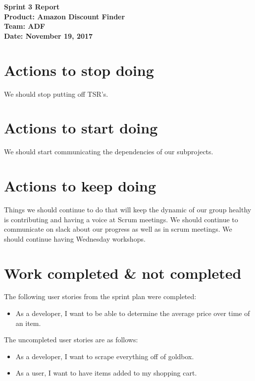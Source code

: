 \documentclass[11pt]{article}
\newcommand\tab[1][1cm]{\hspace*{#1}}
\begin{document}
	\Large{\textbf{Sprint 3 Report}}\\
	\Large{\textbf{Product: Amazon Discount Finder}}\\
	\Large{\textbf{Team: ADF}}\\
	\Large{\textbf{Date: November 19, 2017}}\\
	
	\vspace{-3mm}
	
	\section{Actions to stop doing}
		\vspace{-3mm}
		\tab \normalsize{We should stop putting off TSR's. }
		
	\section{Actions to start doing}
		\vspace{-3mm}
		\tab \normalsize{We should start communicating the dependencies of our subprojects. }
		
	\section{Actions to keep doing}
		\vspace{-3mm}
		\tab \normalsize{Things we should continue to do that will keep the dynamic of our group healthy is contributing and having a voice at Scrum meetings. We should continue to communicate on slack about our progress as well as in scrum meetings. We should continue having Wednesday workshops. }
		
	\section{Work completed \& not completed}
		\vspace{-3mm}
		\normalsize{The following user stories from the sprint plan were completed:}\\
		\vspace{-3mm}
		\begin{itemize}
			\item As a developer, I want to be able to determine the average price over time of an item.
		\end{itemize}
		\vspace{-3mm}
		\normalsize{The uncompleted user stories are as follows:}\\
		\vspace{-3mm}
		\begin{itemize}		
			\item As a developer, I want to scrape everything off of goldbox.
			\item As a user, I want to have items added to my shopping cart.
		\end{itemize}
		\vspace{-3mm}
		
\end{document}
